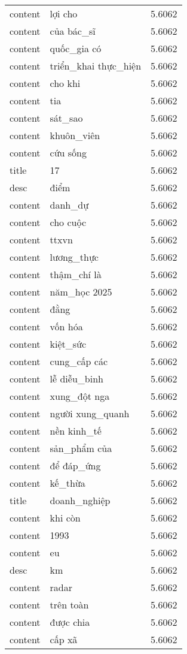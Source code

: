 \documentclass{article}
\begin{document}
\begin{tabular}{lll}
content & lợi cho & 5.6062\\
content & của bác\_sĩ & 5.6062\\
content & quốc\_gia có & 5.6062\\
content & triển\_khai thực\_hiện & 5.6062\\
content & cho khi & 5.6062\\
content & tia & 5.6062\\
content & sát\_sao & 5.6062\\
content & khuôn\_viên & 5.6062\\
content & cứu sống & 5.6062\\
title & 17 & 5.6062\\
desc & điểm & 5.6062\\
content & danh\_dự & 5.6062\\
content & cho cuộc & 5.6062\\
content & ttxvn & 5.6062\\
content & lương\_thực & 5.6062\\
content & thậm\_chí là & 5.6062\\
content & năm\_học 2025 & 5.6062\\
content & đằng & 5.6062\\
content & vốn hóa & 5.6062\\
content & kiệt\_sức & 5.6062\\
content & cung\_cấp các & 5.6062\\
content & lễ diễu\_binh & 5.6062\\
content & xung\_đột nga & 5.6062\\
content & người xung\_quanh & 5.6062\\
content & nền kinh\_tế & 5.6062\\
content & sản\_phẩm của & 5.6062\\
content & để đáp\_ứng & 5.6062\\
content & kế\_thừa & 5.6062\\
title & doanh\_nghiệp & 5.6062\\
content & khi còn & 5.6062\\
content & 1993 & 5.6062\\
content & eu & 5.6062\\
desc & km & 5.6062\\
content & radar & 5.6062\\
content & trên toàn & 5.6062\\
content & được chia & 5.6062\\
content & cấp xã & 5.6062\\

\end{tabular}
\end{document}

